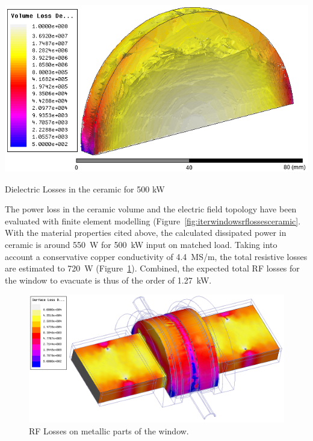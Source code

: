 {\begin{marginfigure}
	\centering
	\includegraphics[width=1.0\linewidth]{figures/chap3/ITER_window/ITER_windows_RFlosses_ceramic}
	\caption{Dielectric Losses in the ceramic for 500 kW}
	\label{fig:iterwindowsrflossesceramic}
\end{marginfigure}

The power loss in the ceramic volume and the electric field topology have been evaluated with finite element modelling (Figure~\ref{fig:iterwindowsrflossesceramic}. With the material properties cited above, the calculated dissipated power in ceramic is around 550~W for 500~kW input on matched load. Taking into account a conservative copper conductivity of 4.4~MS/m, the total resistive losses are estimated to 720~W (Figure~\ref{fig:iterwindowsrflosses}). Combined, the expected total RF losses for the window to evacuate is thus of the order of 1.27~kW. 

\begin{figure}
	\centering
	\includegraphics[width=1.0\linewidth]{figures/chap3/ITER_window/ITER_windows_RFlosses}
	\caption{RF Losses on metallic parts of the window.}
	\label{fig:iterwindowsrflosses}
\end{figure}


}
